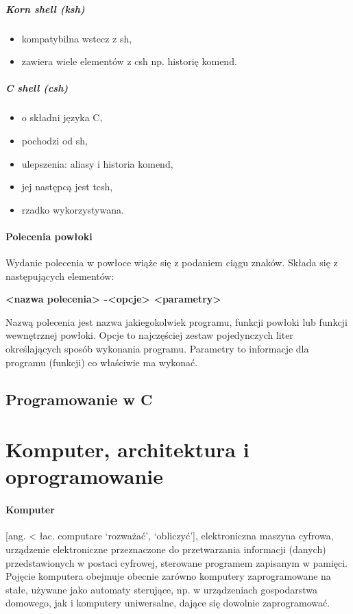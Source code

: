 \documentclass[a4paper,twoside]{report}
\begin{document}
\subparagraph{Korn shell (ksh)}
\begin{itemize}
\item kompatybilna wstecz z sh,
\item zawiera wiele elementów z csh np. historię komend.
\end{itemize}


\subparagraph{C shell (csh)}
\begin{itemize}
\item o składni języka C,
\item pochodzi od sh,
\item ulepszenia: aliasy i historia komend,
\item jej następcą jest tcsh,
\item rzadko wykorzystywana.
\end{itemize}

\paragraph{Polecenia powłoki\\}

Wydanie polecenia w powłoce wiąże się z podaniem ciągu znaków. Składa się z następujących elementów:
\begin{center}\textbf{<nazwa polecenia> -<opcje> <parametry>}\end{center}

Nazwą polecenia jest nazwa jakiegokolwiek programu, funkcji powłoki lub funkcji   wewnętrznej powłoki. Opcje to najczęściej zestaw pojedynczych liter określających     sposób wykonania programu. Parametry to informacje dla programu (funkcji) co   właściwie ma wykonać.

\subsection{Programowanie w C}

\section{Komputer, architektura i oprogramowanie}
\paragraph{Komputer} [ang. < łac. computare ‘rozważać’, ‘obliczyć’], elektroniczna maszyna cyfrowa, urządzenie elektroniczne przeznaczone do przetwarzania informacji (danych) przedstawionych w postaci cyfrowej, sterowane programem zapisanym w pamięci.
Pojęcie komputera obejmuje obecnie zarówno komputery zaprogramowane na stałe, używane jako automaty sterujące, np. w urządzeniach gospodarstwa domowego, jak i komputery uniwersalne, dające się dowolnie zaprogramować.
\end{document}

